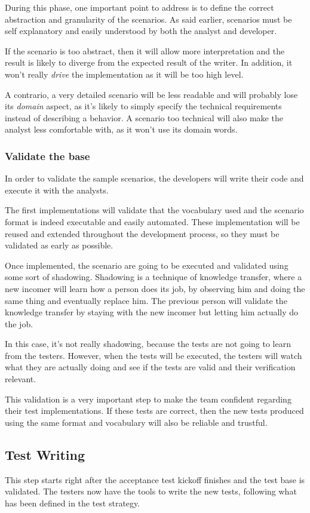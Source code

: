 During this phase, one important point to address is to define the correct
abstraction and granularity of the scenarios.
As said earlier, scenarios must be self explanatory and easily understood by
both the analyst and developer.

If the scenario is too abstract, then it will allow more interpretation and
the result is likely to diverge from the expected result of the writer.
In addition, it won't really \textit{drive} the implementation as it will be
too high level.

A contrario, a very detailed scenario will be less readable and will probably
lose its \textit{domain} aspect, as it's likely to simply specify the
technical requirements instead of describing a behavior.
A scenario too technical will also make the analyst less comfortable with, as
it won't use its domain words.

\subsubsection{Validate the base}
In order to validate the sample scenarios, the developers will write their
code and execute it with the analysts.

The first implementations will validate that the vocabulary used and the
scenario format is indeed executable and easily automated.
These implementation will be reused and extended throughout the development
process, so they must be validated as early as possible.

Once implemented, the scenario are going to be executed and validated using
some sort of shadowing.
Shadowing is a technique of knowledge transfer, where a new incomer will learn
how a person does its job, by observing him and doing the same thing and
eventually replace him.
The previous person will validate the knowledge transfer by staying with the
new incomer but letting him actually do the job.

In this case, it's not really shadowing, because the tests are not going to
learn from the testers.
However, when the tests will be executed, the testers will watch what they
are actually doing and see if the tests are valid and their verification
relevant.

This validation is a very important step to make the team confident regarding
their test implementations.
If these tests are correct, then the new tests produced using the same format
and vocabulary will also be reliable and trustful.

\subsection{Test Writing}\label{subsec:test-writing}
This step starts right after the acceptance test kickoff finishes and the
test base is validated.
The testers now have the tools to write the new tests, following what
has been defined in the test strategy.

